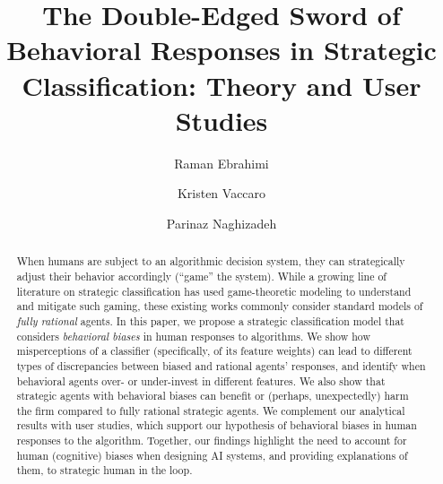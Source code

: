 \documentclass[sigconf]{acmart}
\begin{document}
\title{The Double-Edged Sword of Behavioral Responses in Strategic Classification: Theory and User Studies}

\author{Raman Ebrahimi}

\author{Kristen Vaccaro}

\author{Parinaz Naghizadeh}

\renewcommand{\shortauthors}{Ebrahimi et al.}

\begin{abstract}
  When humans are subject to an algorithmic decision system, they can strategically adjust their behavior accordingly (``game'' the system). 
  While a growing line of literature on strategic classification has used game-theoretic modeling to understand and mitigate such gaming, these existing works commonly consider standard models of \emph{fully rational} agents. 
  In this paper, we propose a strategic classification model that considers \emph{behavioral biases} in human responses to algorithms. We show how misperceptions of a classifier (specifically, of its feature weights) can lead to different types of discrepancies between biased and rational agents' responses, and identify when behavioral agents over- or under-invest in different features. We also show that strategic agents with behavioral biases can benefit or (perhaps, unexpectedly) harm the firm compared to fully rational strategic agents. We complement our analytical results with user studies, which support our hypothesis of behavioral biases in human responses to the algorithm. Together, our findings highlight the need to account for human (cognitive) biases when designing AI systems, and providing explanations of them, to strategic human in the loop. 
\end{abstract}
\end{document}

